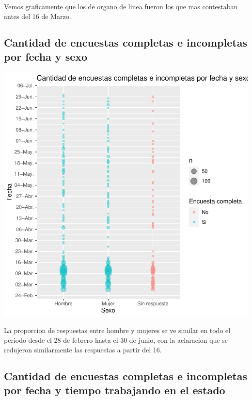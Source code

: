 \documentclass{article}
\begin{document}
Vemos graficamente que los de organo de linea fueron los que mas contestaban antes del 16 de Marzo.

\subsection{Cantidad de encuestas completas e incompletas por fecha y sexo}

\includegraphics{seguimientov3-005}

La proporcion de respuestas entre hombre y mujeres se ve similar en todo el periodo desde el 28 de febrero hasta el 30 de junio, con la aclaracion que se redujeron similarmente las respuestas a partir del 16.

\subsection{Cantidad de encuestas completas e incompletas por fecha y tiempo trabajando en el estado}
\end{document}
